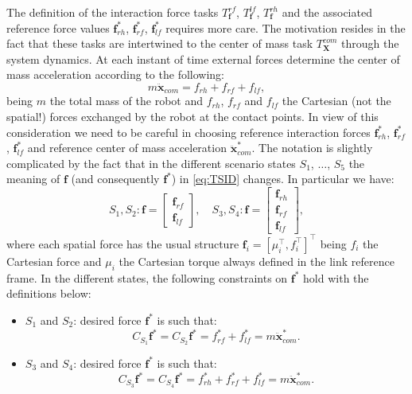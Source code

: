 \documentclass[12pt,a4paper,twoside]{article}
\begin{document}
The definition of the interaction force tasks $T^{rf}_{\bm f}$, $T^{lf}_{\bm f}$, $T^{rh}_{\bm f}$ and the associated reference force values ${{\bm f}}_{rh}^*$, ${{\bm f}}_{rf}^*$, ${{\bm f}}_{lf}^*$ requires more care. The motivation resides in the fact that these tasks are intertwined to the center of mass task $T^{com}_{\bm X}$ through the system dynamics. At each instant of time external forces determine the center of mass acceleration according to the following:
\begin{equation}
m \ddot {\bm x}_{com} = {f}_{rh} + {f}_{rf} + {f}_{lf},
\end{equation}
being $m$ the total mass of the robot and ${f}_{rh}$, ${f}_{rf}$ and ${f}_{lf}$ the Cartesian (not the spatial!) forces exchanged by the robot at the contact points. In view of this consideration we need to be careful in choosing reference interaction forces ${{\bm f}}_{rh}^*$, ${{\bm f}}_{rf}^*$, ${{\bm f}}_{lf}^*$ and reference center of mass acceleration $\ddot {\bm x}^*_{com}$. The notation is slightly complicated by the fact that in the different scenario states $S_1$, $\dots$, $S_5$ the meaning of $\bm f$ (and consequently $\bm f^*$) in \eqref{eq:TSID} changes. In particular we have:
\begin{equation}
S_1, S_2: \bm f = \begin{bmatrix} {\bm f}_{rf} \\ {\bm f}_{lf} \end{bmatrix},  \quad
S_3, S_4: \bm f = \begin{bmatrix} {\bm f}_{rh} \\ {\bm f}_{rf} \\ {\bm f}_{lf} \end{bmatrix}, 
\end{equation}
where each spatial force has the usual structure $\bm f_i = \left[ \mu_i^\top, f_i^\top \right]^\top$ being $f_i$ the Cartesian force and $\mu_i$ the Cartesian torque always defined in the link reference frame. In the different states, the following constraints on $\bm f^*$ hold with the definitions below:
\begin{itemize}
\item $S_1$ and $S_2$: desired force $\bm f^*$ is such that: 
\begin{equation} C_{S_1} \bm f^* = C_{S_2} \bm f^* = {f}^*_{rf} + {f}^*_{lf} = m \ddot {\bm x}^*_{com}. \label{eq:constraintsS1}\end{equation}
\item $S_3$ and $S_4$: desired force $\bm f^*$ is such that:
\begin{equation} C_{S_3} \bm f^*= C_{S_4} \bm f^* = {f}^*_{rh} + {f}^*_{rf} + {f}^*_{lf} = m \ddot {\bm x}^*_{com}. \label{eq:constraintsS3}\end{equation}
\end{itemize}
\end{document}
